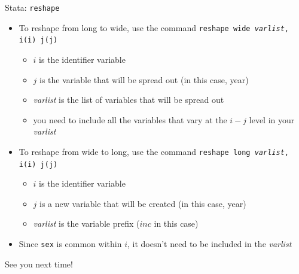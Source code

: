\documentclass[11pt,notes=hide,aspectratio=169,mathserif]{beamer}
\begin{document}
\begin{frame}{Stata: \texttt{reshape}}
\begin{itemize}
\item To reshape from long to wide, use the command \texttt{reshape wide \textit{varlist}, i(i) j(j) }
\begin{itemize}
    \item $i$ is the identifier variable
    \item $j$ is the variable that will be spread out (in this case, year)
    \item \textit{varlist} is the list of variables that will be spread out
    \item you need to include all the variables that vary at the $i-j$ level in your  \textit{varlist}
\end{itemize}

\item To reshape from wide to long, use the command \texttt{reshape long \textit{varlist}, i(i) j(j) }
\begin{itemize}
    \item $i$ is the identifier variable
    \item $j$ is a new variable that will be created (in this case, year) 
    \item \textit{varlist} is the variable prefix ($inc$ in this case)
\end{itemize}
\item Since \texttt{sex} is common within $i$, it doesn't need to be included in the \textit{varlist}
\end{itemize}
\end{frame}


\begin{frame}
\begin{center}{\LARGE See you next time!}\end{center}
\end{frame}
\end{document}
